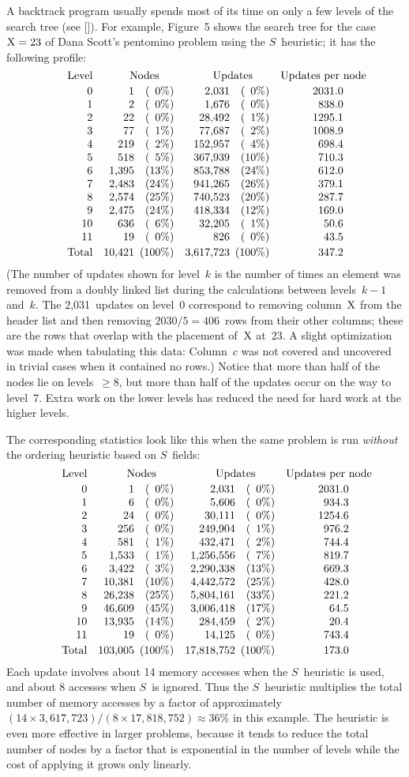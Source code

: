A backtrack program usually spends most of its time on only a few
levels of the search tree (see [\MC]).  For example, Figure~5 shows
the search tree for the case $\rm X=23$ of Dana Scott's pentomino problem
using the $S$~heuristic;
it has the following profile:
$$\vbox{\halign{\hfil#\quad&\hfil#\quad&(\hfil#\%)\quad&\hfil#\quad&(\hfil#\%)\quad&\hfil#\cr
Level&\multispan2\hfil Nodes\hfil&\multispan2\hfil Updates\hfil&Updates per \rlap{node}\cr
\noalign{\vskip2pt}
 0&    1&  0&   2,031&  0& 2031.0\cr
 1&    2&  0&   1,676&  0&  838.0\cr
 2&   22&  0&  28,492&  1& 1295.1\cr
 3&   77&  1&  77,687&  2& 1008.9\cr
 4&  219&  2& 152,957&  4&  698.4\cr
 5&  518&  5& 367,939& 10&  710.3\cr
 6& 1,395& 13& 853,788& 24&  612.0\cr
 7& 2,483& 24& 941,265& 26&  379.1\cr
 8& 2,574& 25& 740,523& 20&  287.7\cr
 9& 2,475& 24& 418,334& 12&  169.0\cr
10&  636&  6&  32,205&  1&   50.6\cr
11&   19&  0&    826&  0&   43.5\cr
\noalign{\vskip2pt}
Total&10,421&\omit\hidewidth(100\%)\quad&\hfil 3,617,723&\omit\hidewidth(100\%)\quad&347.2\cr}}$$
(The number of updates shown for level~$k$ is the number of times an
element was removed from a doubly linked list during the calculations
between levels~$k-1$ and~$k$.  The 2,031~updates on level~0 correspond
to removing column~$\rm X$ from the header list and then removing
$2030/5=406$~rows from their other columns; these are the rows that
\vadjust{\goodbreak}%
overlap with the placement of~$\rm X$ at~23.  A slight optimization was
made when tabulating this data: Column~$c$ was not covered and
uncovered in trivial cases when it contained no rows.)  Notice that
more than half of the nodes lie on levels~$\ge8$, but more than half
of the updates occur on the way to level~7.  Extra work on the lower
levels has reduced the need for hard work at the higher levels.

The corresponding statistics look like this when the same problem is
run {\it without\/} the ordering heuristic based on $S$~fields:
$$\vbox{\halign{\hfil#\quad&\hfil#\quad&(\hfil#\%)\quad&\hfil#\quad&(\hfil#\%)\quad&\hfil#\cr
Level&\multispan2\hfil Nodes\hfil&\multispan2\hfil Updates\hfil&Updates per \rlap{node}\cr
\noalign{\vskip2pt}
0& 1& 0& 2{,}031& 0& 2031.0\cr
1& 6& 0& 5{,}606& 0& 934.3\cr
2& 24& 0& 30{,}111& 0& 1254.6\cr
3& 256& 0& 249{,}904& 1& 976.2\cr
4& 581& 1& 432{,}471& 2& 744.4\cr
5& 1{,}533& 1& 1{,}256{,}556& 7& 819.7\cr
6& 3{,}422& 3& 2{,}290{,}338& 13& 669.3\cr
7& 10{,}381& 10& 4{,}442{,}572& 25& 428.0\cr
8& 26{,}238& 25& 5{,}804{,}161& 33& 221.2\cr
9& 46{,}609& 45& 3{,}006{,}418& 17& 64.5\cr
10& 13{,}935& 14& 284{,}459& 2& 20.4\cr
11& 19& 0& 14{,}125& 0& 743.4\cr
\noalign{\vskip2pt}
Total&103{,}005&\omit\hidewidth(100\%)\quad&17{,}818{,}752&\omit\hidewidth(100\%)\quad&173.0\cr}}$$
Each update involves about 14 memory accesses when the $S$~heuristic
is used, and about 8 accesses when $S$~is ignored.  Thus the
$S$~heuristic multiplies the total number of memory accesses by a factor
of approximately $(14\times3{,}617{,}723)/(8\times17{,}818{,}752)\approx36\%$ in this
example.  The heuristic is even more effective in larger problems,
because it tends to reduce the total number of nodes by a factor that
is exponential in the number of levels while the cost of applying it
grows only linearly.

